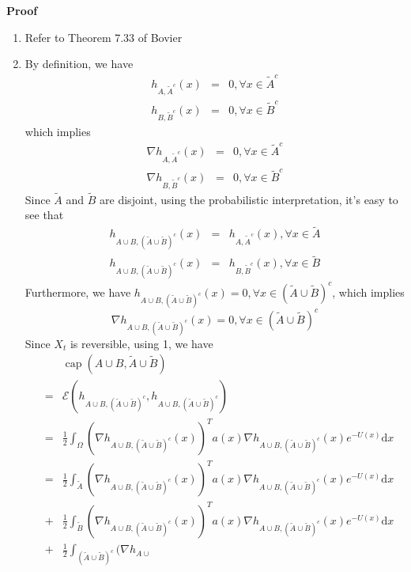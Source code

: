 \documentclass[english, aip, jcp, priprint, graphicx,floatfix]{revtex4-1}
\newcommand{\mathd}{\mathrm{d}}
\newcommand{\tmop}[1]{\ensuremath{\operatorname{#1}}}
\theoremstyle{plain}
\theoremstyle{definition}
\theoremstyle{plain}
\begin{document}
\noindent\textbf{Proof\ }
\begin{enumerate}
\item Refer to Theorem 7.33 of Bovier\cite{Bovier2016-ez}

\item By definition, we have
\begin{eqnarray*}
h_{A, \widetilde{A^{}}^c} (x) & = & 0, \forall x \in \tilde{A}^c\\
h_{B, \tilde{B}^c} (x) & = & 0, \forall x \in \tilde{B}^c
\end{eqnarray*}
which implies
\begin{eqnarray*}
\nabla h_{A, \widetilde{A^{}}^c} (x) & = & 0, \forall x \in \tilde{A}^c\\
\nabla h_{B, \tilde{B}^c} (x) & = & 0, \forall x \in \tilde{B}^c
\end{eqnarray*}
Since $\tilde{A}$ and $\tilde{B}$ are disjoint, using the probabilistic interpretation, it's easy to see that
\begin{eqnarray*}
h_{A \cup B, (\tilde{A} \cup \tilde{B})^c} (x) & = & h_{A,
\widetilde{A^{}}^c} (x), \forall x \in \tilde{A}\\
h_{A \cup B, (\tilde{A} \cup \tilde{B})^c} (x) & = & h_{B, \tilde{B}^c}
(x), \forall x \in \tilde{B}
\end{eqnarray*}
Furthermore, we have $h_{A \cup B, (\tilde{A} \cup \tilde{B})^c} (x) = 0, \forall x \in (\tilde{A} \cup \tilde{B})^c$, which implies
\[ \nabla h_{A \cup B, (\tilde{A} \cup \tilde{B})^c} (x) = 0, \forall x \in
(\tilde{A} \cup \tilde{B})^c \]
Since $X_t$ is reversible, using 1, we have
\begin{eqnarray*}
&  & \tmop{cap} (A \cup B, \tilde{A} \cup \tilde{B})\\
& = & \mathcal{E} (h_{A \cup B, (\tilde{A} \cup \tilde{B})^c}, h_{A \cup
B, (\tilde{A} \cup \tilde{B})^c})\\
& = & \frac{1}{2} \int_{\Omega} (\nabla h_{A \cup B, (\tilde{A}
\cup \tilde{B})^c} (x))^T a (x) \nabla h_{A \cup B, (\tilde{A} \cup
\tilde{B})^c} (x) e^{- U (x)} \mathd x\\
& = & \frac{1}{2} \int_{\tilde{A}} (\nabla h_{A \cup B, (\tilde{A} \cup
\tilde{B})^c} (x))^T a (x) \nabla h_{A \cup B, (\tilde{A} \cup
\tilde{B})^c} (x) e^{- U (x)} \mathd x\\
& + & \frac{1}{2} \int_{\tilde{B}} (\nabla h_{A \cup B, (\tilde{A} \cup
\tilde{B})^c} (x))^T a (x) \nabla h_{A \cup B, (\tilde{A} \cup
\tilde{B})^c} (x) e^{- U (x)} \mathd x\\
& + & \frac{1}{2} \int_{(\tilde{A} \cup \tilde{B})^c} (\nabla h_{A \cup
}
\end{eqnarray*}
\end{enumerate}
\end{document}
